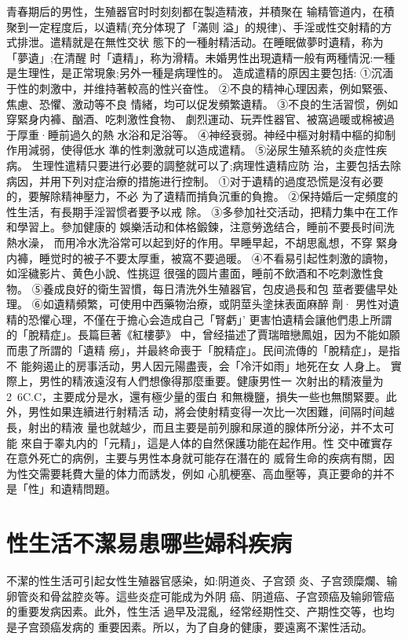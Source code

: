\documentclass[12pt,UTF8]{ctexbook}
\begin{document}
青春期后的男性，生殖器官时时刻刻都在製造精液，并積聚在
输精管道内，在積聚到一定程度后，以遺精(充分体現了「滿则
溢」的規律)、手淫或性交射精的方式排泄。遣精就是在無性交状
態下的一種射精活动。在睡眠做夢时遺精，称为「夢遺」;在清醒
时「遺精」，称为滑精。未婚男性出現遺精一般有两種情況:一種
是生理性，是正常現象;另外一種是病理性的。
造成遣精的原因主要包括:
①沉湎于性的刺激中，并维持著較高的性兴奋性。
②不良的精神心理因素，例如緊張、焦慮、恐懼、激动等不良
情緒，均可以促发頻繁遺精。
③不良的生活習惯，例如穿緊身内褲、酗酒、吃刺激性食物、
劇烈運动、玩弄性器官、被窩過暖或棉被過于厚重·睡前過久的熱
水浴和足浴等。
④神经衰弱。神经中樞对射精中樞的抑制作用減弱，使得低水
準的性刺激就可以造成遣精。
⑤泌尿生殖系統的炎症性疾病。
生理性遣精只要进行必要的調整就可以了;病理性遺精应防
治，主要包括去除病因，并用下列对症治療的措施进行控制。
①对于遺精的過度恐慌是沒有必要的，要解除精神壓力，不必
为了遺精而掯負沉重的負擔。
②保持婚后一定頻度的性生活，有長期手淫習惯者要予以戒
除。
③多參加社交活动，把精力集中在工作和學習上。參加健康的
娛樂活动和体格鍛鍊，注意勞逸结合，睡前不要長时间洗熱水澡，
而用冷水洗浴常可以起到好的作用。早睡早起，不胡思亂想，不穿
緊身内褲，睡觉时的被子不要太厚重，被窩不要過暖。
④不看易引起性刺激的讀物，如淫穢影片、黄色小說、性挑逗
很强的圆片畫面，睡前不飲酒和不吃刺激性食物。
⑤養成良好的衛生習慣，每日清洗外生殖器官，包皮過長和包
莖者要儘早处理。
⑥如遺精頻繁，可使用中西藥物治療，或阴莖头塗抹表面麻醉
劑·
男性对遺精的恐懼心理，不僅在于擔心会造成自己「腎虧」’
更害怕遺精会讓他們患上所謂的「脫精症」。長篇巨著《紅樓夢》
中，曾经描述了賈瑞暗戀鳳姐，因为不能如願而患了所謂的「遺精
癆」，并最終命喪于「脫精症」。民间流傳的「脫精症」，是指不
能夠遏止的房事活动，男人因元陽盡喪，会「冷汗如雨」地死在女
人身上。
實際上，男性的精液遠沒有人們想像得那麼重要。健康男性一
次射出的精液量为2~6C.C，主要成分是水，還有極少量的蛋白
和無機鹽，損失一些也無關緊要。此外，男性如果连續进行射精活
动，將会使射精变得一次比一次困難，间隔时间越長，射出的精液
量也就越少，而且主要是前列腺和尿道的腺体所分泌，并不太可能
來自于睾丸内的「元精」，這是人体的自然保護功能在起作用。性
交中確實存在意外死亡的病例，主要与男性本身就可能存在潛在的
威脅生命的疾病有關，因为性交需要耗費大量的体力而誘发，例如
心肌梗塞、高血壓等，真正要命的并不是「性」和遺精問題。

\section{性生活不潔易患哪些婦科疾病}

不潔的性生活可引起女性生殖器官感染，如:阴道炎、子宫颈
炎、子宫颈糜爛、输卵管炎和骨盆腔炎等。這些炎症可能成为外阴
癌、阴道癌、子宫颈癌及输卵管癌的重要发病因素。此外，性生活
過早及混亂，经常经期性交、产期性交等，也均是子宫颈癌发病的
重要因素。所以，为了自身的健康，要遠离不潔性活动。
\end{document}
